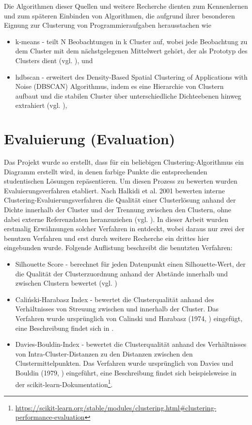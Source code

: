 Die Algorithmen dieser Quellen und weitere Recherche dienten zum Kennenlernen und zum späteren Einbinden von Algorithmen, die aufgrund ihrer besonderen Eignung zur Clusterung von Programmieraufgaben herausstachen wie 
\begin{itemize}
    \item k-means - teilt N Beobachtungen in k Cluster auf, wobei jede Beobachtung zu dem Cluster mit dem nächstgelegenen Mittelwert gehört, der als Prototyp des Clusters dient (vgl. \cite{MacQueen.1967}), und
    \item hdbscan - erweitert des Density-Based Spatial Clustering of Applications with Noise (DBSCAN) Algorithmus, indem es eine Hierarchie von Clustern aufbaut und die stabilen Cluster über unterschiedliche Dichteebenen hinweg extrahiert (vgl. \cite{CampelloRicardoJ.G.B..}),
\end{itemize}

\section{Evaluierung (Evaluation)}
Das Projekt wurde so erstellt, dass für ein beliebigen Clustering-Algorithmus ein Diagramm erstellt wird, in denen farbige Punkte die entsprechenden studentischen Lösungen repäsentieren. Um diesen Prozess zu bewerten wurden Evaluierungsverfahren etabliert. Nach Halkidi et al. 2001 bewerten interne Clustering-Evaluierungsverfahren die Qualität einer Clusterlösung anhand der Dichte innerhalb der Cluster und der Trennung zwischen den Clustern, ohne dabei externe Referenzdaten heranzuziehen (vgl. \cite{Halkidi.2001}). In dieser Arbeit wurden erstmalig Erwähnungen solcher Verfahren in \cite{YoussefLahmadiMohammedZakariaeElKhattabiMouniaRahhaliLahcenOughdir.2024} entdeckt, wobei daraus nur zwei der benutzen Verfahren und erst durch weitere Recherche ein drittes hier eingebunden wurde. Folgende Auflistung beschreibt die benutzten Verfahren:
\begin{itemize}
    \item Silhouette Score - berechnet für jeden Datenpunkt einen Silhouette-Wert, der die Qualität der Clusterzuordnung anhand der Abstände innerhalb und zwischen Clustern bewertet (vgl. \cite{Rousseeuw.1987})
    \item Caliński-Harabasz Index - bewertet die Clusterqualität anhand des Verhältnisses von Streuung zwischen und innerhalb der Cluster. Das Verfahren wurde ursprünglich von Calinski und Harabasz (1974,  \cite{CalinskiT.andHarabaszJ..1974}) eingefügt, eine Beschreibung findet sich in \cite{Halkidi.2001}.
    \item Davies-Bouldin-Index - bewertet die Clusterqualität anhand des Verhältnisses von Intra-Cluster-Distanzen zu den Distanzen zwischen den Clustermittelpunkten. Das Verfahren wurde ursprünglich von Davies und Bouldin (1979, \cite{Davies.1979}) eingeführt, eine Beschreibung findet sich beispielsweise in der scikit-learn-Dokumentation\footnote{\url{https://scikit-learn.org/stable/modules/clustering.html\#clustering-performance-evaluation}}.
\end{itemize}



